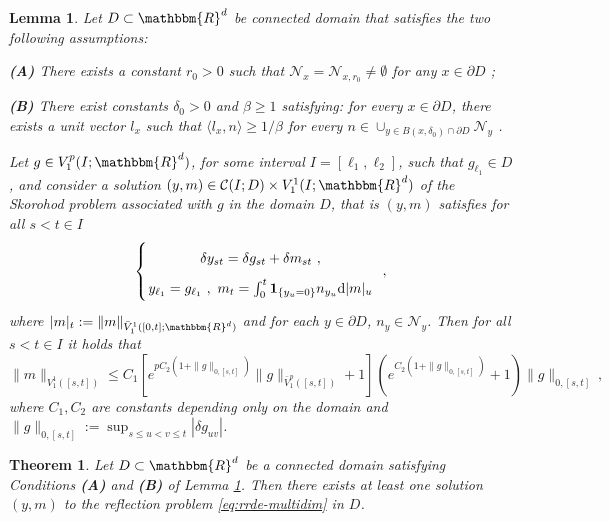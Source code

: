 \documentclass[11pt,reqno,oneside]{amsart}
\numberwithin{equation}{section}
\newcommand{\assign}{:=}
\newcommand{\mathd}{\mathrm{d}}
\newtheorem{lemma}{Lemma}
\newtheorem{theorem}{Theorem}
\newcommand{\cn}{{\mathcal N}}
\begin{document}
\begin{lemma}\label{lem:boun-skoro-gene}
Let $D \subset \mathbbm{R}^d$ be connected domain that satisfies the two following assumptions:

\smallskip

\noindent
{\em\textbf{(A)}} There exists a constant $r_0 > 0$ such that $\cn_x=\cn_{x,r_0}\neq \emptyset$ for any $x\in \partial D$  ;

\smallskip

\noindent
{\em\textbf{(B)}} There exist constants $\delta_0 > 0$ and $\beta \geqslant 1$ satisfying: for every $x\in \partial D$, there exists a unit vector $l_x$ such that $\langle l_x ,n\rangle \geqslant 1/\beta$
for every $n \in \cup_{y\in B(x,\delta_0)\cap \partial D} \cn_y$  . 

\smallskip

\noindent
Let $g\in V_1^p(I;\mathbbm{R}^d)$, for some interval $I=[\ell_1,\ell_2]$, such that $g_{\ell_1}\in D$, and consider a solution $(y,m)\in \mathcal{C}(I;D) \times V^1_1(I;\mathbbm{R}^d)$ of the Skorohod problem associated with $g$ in the domain $D$, that is $(y,m)$ satisfies for all $s<t\in I$
$$\arraycolsep=1pt\def\arraystretch{1.8}
\left\lbrace\begin{array}{c}
\delta y_{st}=\delta g_{st}+\delta m_{st} \ , \\
y_{\ell_1}=g_{\ell_1} \ , \ m_t=\int_0^t \mathbf{1}_{\{y_u=0\}} n_{y_u}\mathd |m|_u
\end{array} \right. \ ,
$$
where $|m|_t:=\|m\|_{\bar{V}^1_1 ([0, t] ; \mathbbm{R}^d)}$ and for each $y\in \partial D$, $n_y \in \cn_{y}$.
Then for all $s<t\in I$ it holds that 
\begin{equation}\label{skorohod-bound-general}
\| m\|_{V_1^1([s,t])} \leqslant C_1  [e^{p C_2 (1 + \|
     g \|_{0, [s, t]})} \|g\|_{\bar{V}_1^p([s,t])} + 1]^{}
     (e^{C_2 (1 + \| g \|_{0, [s, t]})} + 1) \| g
     \|_{0, [s, t]}\ ,
\end{equation}
where $C_1, C_2$ are constants depending only on the domain and $\lVert g \rVert_{0,[s,t]}\assign \sup_{s\leqslant u<v\leqslant t} |\delta g_{uv}|$.
\end{lemma}

\smallskip

\begin{theorem}\label{theo:existence-general-domains}
Let $D\subset \mathbbm{R}^d$ be a connected domain satisfying Conditions {\em\textbf{(A)}} and {\em\textbf{(B)}} of Lemma \ref{lem:boun-skoro-gene}. Then there exists at least one solution $(y,m)$ to the reflection problem \eqref{eq:rrde-multidim} in $D$.
\end{theorem}
\end{document}
